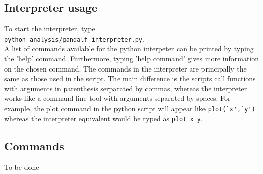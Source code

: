 \documentclass[a4paper]{article}
\newcommand{\var}[1]{\texttt{#1}}
\begin{document}
\subsection{Interpreter usage}

To start the interpreter, type \\
\newline
\noindent \var{python analysis/gandalf\_interpreter.py}. \\
\newline
A list of commands available for the python interpeter can be printed by typing the 'help' command.  Furthermore, typing 'help command' gives more information on the chosen command.  The commands in the interpreter are principally the same as those used in the script.  The main difference is the scripts call functions with arguments in parenthesis serparated by commas, whereas the interpreter works like a command-line tool with arguments separated by spaces.  For example, the plot command in the python script will appear like \lstinline{plot(`x',`y')} whereas the interpreter equivalent would be typed as \var{plot x y}.





\subsection{Commands}
To be done



\end{document}
